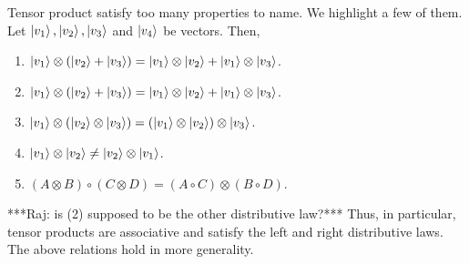 Tensor product satisfy too many properties to name.  We highlight a few of them. 
Let $\ket{v_1}, \ket{v_2}, \ket{v_3}$ and $\ket{v_4}$ be vectors.  Then,
\begin{enumerate}
    \item $\ket{v_1} \otimes (\ket{v_2}+\ket{v_3})=\ket{v_1} \otimes \ket{v_2} + \ket{v_1} \otimes \ket{v_3}$.
    \item $\ket{v_1} \otimes (\ket{v_2}+\ket{v_3})=\ket{v_1} \otimes \ket{v_2} + \ket{v_1} \otimes \ket{v_3}$.
    \item $\ket{v_1} \otimes (\ket{v_2} \otimes \ket{v_3})=(\ket{v_1} \otimes \ket{v_2}) \otimes \ket{v_3}$.
    \item $\ket{v_1} \otimes \ket{v_2} \ne \ket{v_2} \otimes \ket{v_1}$.
    \item $(A \otimes B)\circ(C \otimes D)=(A \circ C) \otimes (B \circ D)$.
\end{enumerate}
***Raj: is (2) supposed to be the other distributive law?***
Thus, in particular, tensor products are associative and satisfy the left and right distributive laws.  The above relations hold in more generality.   
